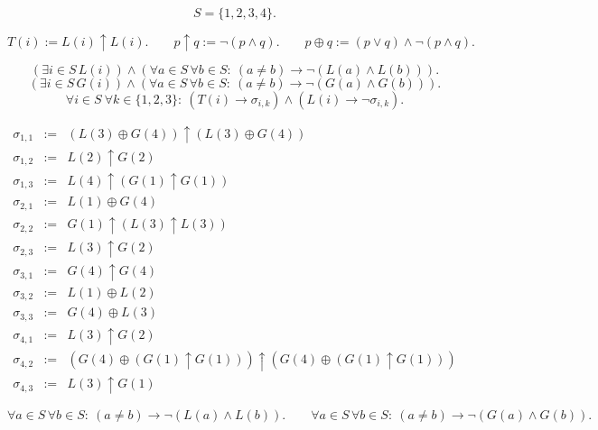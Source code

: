 
\Problem

\[
S=\{1,2,3,4\}.
\]

\[
T(i):=L(i)\uparrow L(i).
\qquad
p\uparrow q := \neg(p\land q).
\qquad
p\oplus q := (p\lor q)\land\neg(p\land q).
\]

\[
(\exists i\in S\,L(i))\land(\forall a\in S\,\forall b\in S:\ (a\neq b)\to\neg(L(a)\land L(b))).
\]
\[
(\exists i\in S\,G(i))\land(\forall a\in S\,\forall b\in S:\ (a\neq b)\to\neg(G(a)\land G(b))).
\]
\[
\forall i\in S\ \forall k\in\{1,2,3\}:\ (T(i)\to\sigma_{i,k})\land(L(i)\to\neg\sigma_{i,k}).
\]

\[
\begin{array}{rcl}
\sigma_{1,1}&:=&(L(3)\oplus G(4))\uparrow(L(3)\oplus G(4))\\
\sigma_{1,2}&:=&L(2)\uparrow G(2)\\
\sigma_{1,3}&:=&L(4)\uparrow (G(1)\uparrow G(1))\\[2pt]
\sigma_{2,1}&:=&L(1)\oplus G(4)\\
\sigma_{2,2}&:=&G(1)\uparrow (L(3)\uparrow L(3))\\
\sigma_{2,3}&:=&L(3)\uparrow G(2)\\[2pt]
\sigma_{3,1}&:=&G(4)\uparrow G(4)\\
\sigma_{3,2}&:=&L(1)\oplus L(2)\\
\sigma_{3,3}&:=&G(4)\oplus L(3)\\[2pt]
\sigma_{4,1}&:=&L(3)\uparrow G(2)\\
\sigma_{4,2}&:=&(G(4)\oplus(G(1)\uparrow G(1)))\uparrow(G(4)\oplus(G(1)\uparrow G(1)))\\
\sigma_{4,3}&:=&L(3)\uparrow G(1)
\end{array}
\]


\SolutionPage

\[
\forall a\in S\,\forall b\in S:\ (a\neq b)\to\neg(L(a)\land L(b)).
\qquad
\forall a\in S\,\forall b\in S:\ (a\neq b)\to\neg(G(a)\land G(b)).
\]


